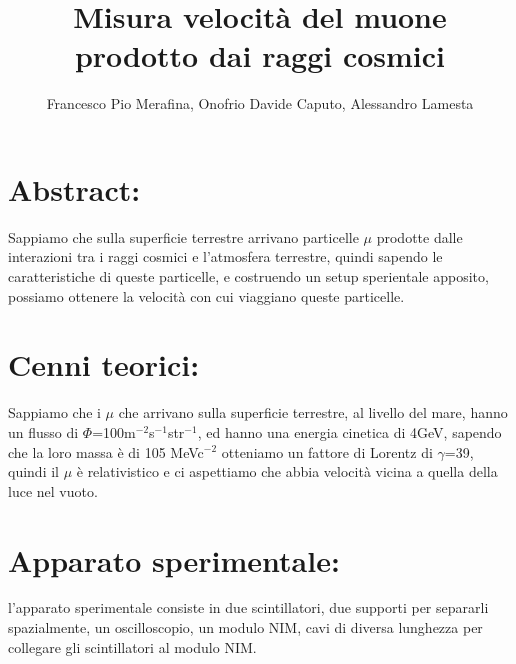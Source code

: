 \documentclass{article}
\title{Misura velocità del muone prodotto dai raggi cosmici}
\author{Francesco Pio Merafina, Onofrio Davide Caputo, Alessandro Lamesta}
\date{}
\begin{document}
\maketitle
\section{Abstract:}
Sappiamo che sulla superficie terrestre arrivano particelle $\mu$ prodotte dalle interazioni tra i raggi cosmici e l'atmosfera terrestre, quindi sapendo le caratteristiche di queste particelle, e costruendo un setup sperientale apposito, possiamo ottenere la velocità con cui viaggiano queste particelle.
~
\section{Cenni teorici:}
Sappiamo che i $\mu$ che arrivano sulla superficie terrestre, al livello del mare, hanno un flusso di $\Phi$=100m$^{-2}$s$^{-1}$str$^{-1}$, ed hanno una energia cinetica di 4GeV, sapendo che la loro massa è di 105 MeVc$^{-2}$ otteniamo un fattore di Lorentz di $\gamma$=39, quindi il $\mu$ è relativistico e ci aspettiamo che abbia velocità vicina a quella della luce nel vuoto.
~
\section{Apparato sperimentale:}
l'apparato sperimentale consiste in due scintillatori, due supporti per separarli spazialmente, un oscilloscopio, un modulo NIM, cavi di diversa lunghezza per collegare gli scintillatori al modulo NIM.
~
\end{document}
